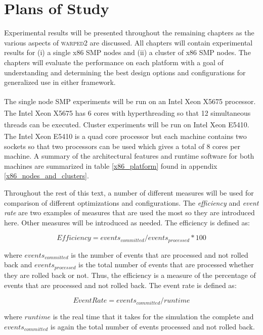 \documentclass[11pt]{book}
\begin{document}
\chapter{Plans of Study}\label{plans_of_study}

Experimental results will be presented throughout the remaining chapters as the various aspects
of \textsc{warped2} are discussed.  All chapters will contain experimental results for (i) a single
x86 SMP nodes and (ii) a cluster of x86 SMP nodes.   The chapters will evaluate the performance on
each platform with a goal of understanding and determining the best design options and
configurations for generalized use in either framework.

The single node SMP experiments will be run on an Intel\textsuperscript{\textregistered}
Xeon\textsuperscript{\textregistered} X5675 processor.  The Intel\textsuperscript{\textregistered}
Xeon\textsuperscript{\textregistered} X5675 has 6 cores with hyperthreading so that 12 simultaneous
threads can be executed.  Cluster experiments will be run on Intel\textsuperscript{\textregistered}
Xeon\textsuperscript{\textregistered} E5410.  The Intel\textsuperscript{\textregistered}
Xeon\textsuperscript{\textregistered} E5410 is a quad core processor but each machine contains two
sockets so that two processors can be used which gives a total of 8 cores per machine.  A summary of
the architectural features and runtime software for both machines are summarized in table
\ref{x86_platform} found in appendix \ref{x86_nodes_and_clusters}.

Throughout the rest of this text, a number of different measures will be used for comparison of
different optimizations and configurations.  The \emph{efficiency} and \emph{event rate} are two
examples of measures that are used the most so they are introduced here.  Other measures will be
introduced as needed.  The efficiency is defined as:

$$ Efficiency = {events_{committed}}/{events_{processed}} * 100 $$

\noindent
where $events_{committed}$ is the number of events that are processed and not rolled back and
$events_{processed}$ is the total number of events that are processed whether they are rolled back
or not.  Thus, the efficiency is a measure of the percentage of events that are processed and not
rolled back.  The event rate is defined as:

$$ Event Rate = {events_{committed}}/{runtime} $$

\noindent
where $runtime$ is the real time that it takes for the simulation the complete and
$events_{committed}$ is again the total number of events processed and not rolled back.
\end{document}

